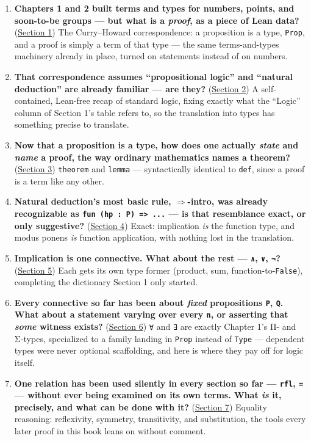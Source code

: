 \begin{enumerate}
\def\labelenumi{\arabic{enumi}.}
\tightlist
\item
  \textbf{Chapters 1 and 2 built terms and types for numbers, points, and soon-to-be groups --- but what is a \emph{proof}, as a piece of Lean data?} (\hyperref[sec:03-propositions-and-proofs:01-prop:1]{Section 1}) The Curry--Howard correspondence: a proposition is a type, \texttt{Prop}, and a proof is simply a term of that type --- the same terms-and-types machinery already in place, turned on statements instead of on numbers.
\item
  \textbf{That correspondence assumes ``propositional logic'' and ``natural deduction'' are already familiar --- are they?} (\hyperref[sec:03-propositions-and-proofs:02-logic-recap:1]{Section 2}) A self-contained, Lean-free recap of standard logic, fixing exactly what the ``Logic'' column of Section 1's table refers to, so the translation into types has something precise to translate.
\item
  \textbf{Now that a proposition is a type, how does one actually \emph{state} and \emph{name} a proof, the way ordinary mathematics names a theorem?} (\hyperref[sec:03-propositions-and-proofs:03-theorem-lemma:1]{Section 3}) \texttt{theorem} and \texttt{lemma} --- syntactically identical to \texttt{def}, since a proof is a term like any other.
\item
  \textbf{Natural deduction's most basic rule, \(\Rightarrow\)-intro, was already recognizable as \texttt{fun (hp : P) => ...} --- is that resemblance exact, or only suggestive?} (\hyperref[sec:03-propositions-and-proofs:04-implication:1]{Section 4}) Exact: implication \emph{is} the function type, and modus ponens \emph{is} function application, with nothing lost in the translation.
\item
  \textbf{Implication is one connective. What about the rest --- \texttt{∧}, \texttt{∨}, \texttt{¬}?} (\hyperref[sec:03-propositions-and-proofs:05-and-or-not:1]{Section 5}) Each gets its own type former (product, sum, function-to-\texttt{False}), completing the dictionary Section 1 only started.
\item
  \textbf{Every connective so far has been about \emph{fixed} propositions \texttt{P}, \texttt{Q}. What about a statement varying over every \texttt{n}, or asserting that \emph{some} witness exists?} (\hyperref[sec:03-propositions-and-proofs:06-quantifiers:1]{Section 6}) \texttt{∀} and \texttt{∃} are exactly Chapter 1's Π- and Σ-types, specialized to a family landing in \texttt{Prop} instead of \texttt{Type} --- dependent types were never optional scaffolding, and here is where they pay off for logic itself.
\item
  \textbf{One relation has been used silently in every section so far --- \texttt{rfl}, \texttt{=} --- without ever being examined on its own terms. What \emph{is} it, precisely, and what can be done with it?} (\hyperref[sec:03-propositions-and-proofs:07-equality:1]{Section 7}) Equality reasoning: reflexivity, symmetry, transitivity, and substitution, the tools every later proof in this book leans on without comment.
\end{enumerate}

